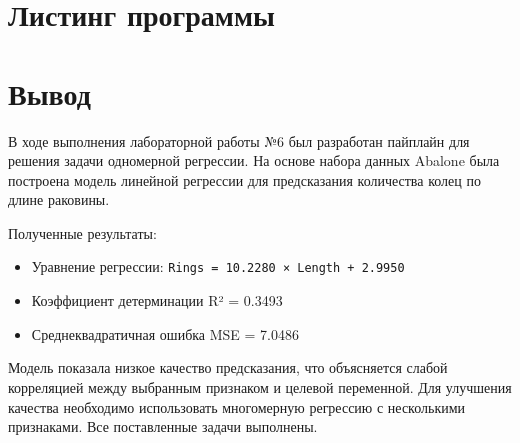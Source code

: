 \section{Листинг программы}



\section*{Вывод}

В ходе выполнения лабораторной работы №6 был разработан пайплайн для решения задачи одномерной регрессии. На основе набора данных Abalone была построена модель линейной регрессии для предсказания количества колец по длине раковины.

Полученные результаты:
\begin{itemize}
    \item Уравнение регрессии: \texttt{Rings = 10.2280 × Length + 2.9950}
    \item Коэффициент детерминации R² = 0.3493
    \item Среднеквадратичная ошибка MSE = 7.0486
\end{itemize}

Модель показала низкое качество предсказания, что объясняется слабой корреляцией между выбранным признаком и целевой переменной. Для улучшения качества необходимо использовать многомерную регрессию с несколькими признаками. Все поставленные задачи выполнены.

\endinput